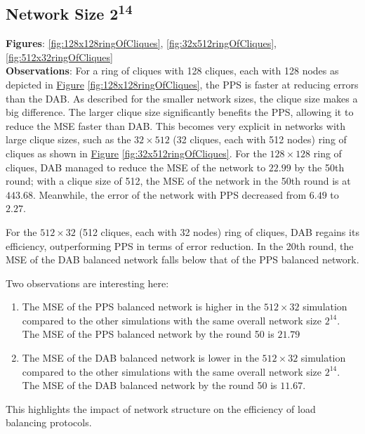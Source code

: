\subsection{Network Size 2\textsuperscript{14}}
\textbf{Figures}: \ref{fig:128x128ringOfCliques}, \ref{fig:32x512ringOfCliques}, \ref{fig:512x32ringOfCliques}\\
\textbf{Observations}: For a ring of cliques with 128 cliques, each with 128 nodes as depicted in \hyperref[fig:128x128ringOfCliques]{Figure} \ref{fig:128x128ringOfCliques}, the PPS is faster at reducing errors than the DAB. As described for the smaller network sizes, the clique size makes a big difference. The larger clique size significantly benefits the PPS, allowing it to reduce the MSE faster than DAB. This becomes very explicit in networks with large clique sizes, such as the $32 \times 512$ (32 cliques, each with 512 nodes) ring of cliques as shown in \hyperref[fig:32x512ringOfCliques]{Figure} \ref{fig:32x512ringOfCliques}. For the $128 \times 128$ ring of cliques, DAB managed to reduce the MSE of the network to $22.99$ by the 50th round; with a clique size of 512, the MSE of the network in the 50th round is at $443.68$. Meanwhile, the error of the network with PPS decreased from $6.49$ to $2.27$.

For the $512 \times 32$ (512 cliques, each with 32 nodes) ring of cliques, DAB regains its efficiency, outperforming PPS in terms of error reduction. In the 20th round, the MSE of the DAB balanced network falls below that of the PPS balanced network.

Two observations are interesting here:
\begin{enumerate}
    \item The MSE of the PPS balanced network is higher in the $512 \times 32$ simulation compared to the other simulations with the same overall network size $2^{14}$. The MSE of the PPS balanced network by the round 50 is $21.79$
    \item The MSE of the DAB balanced network is lower in the $512 \times 32$ simulation compared to the other simulations with the same overall network size $2^{14}$. The MSE of the DAB balanced network by the round 50 is $11.67$.
\end{enumerate}
This highlights the impact of network structure on the efficiency of load balancing protocols.



